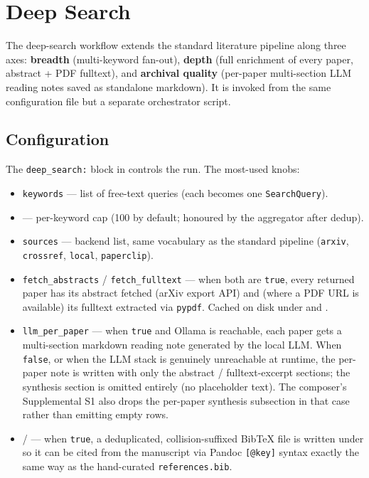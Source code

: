 \documentclass[
  english,
]{article}
\providecommand{\tightlist}{%
  \setlength{\itemsep}{0pt}\setlength{\parskip}{0pt}}
\begin{document}
\newpage

\section{Deep Search}\label{sec:deep_search}

The deep-search workflow extends the standard literature pipeline along
three axes: \textbf{breadth} (multi-keyword fan-out), \textbf{depth}
(full enrichment of every paper, abstract + PDF fulltext), and
\textbf{archival quality} (per-paper multi-section LLM reading notes
saved as standalone markdown). It is invoked from the same configuration
file but a separate orchestrator script.

\subsection{Configuration}\label{configuration}

The \texttt{deep\_search:} block in 
controls the run. The most-used knobs:

\begin{itemize}
\tightlist
\item
  \texttt{keywords} --- list of free-text queries (each becomes one
  \texttt{SearchQuery}).
\item
   --- per-keyword cap (100 by
  default; honoured by the aggregator after dedup).
\item
  \texttt{sources} --- backend list, same vocabulary as the standard
  pipeline (\texttt{arxiv}, \texttt{crossref}, \texttt{local},
  \texttt{paperclip}).
\item
  \texttt{fetch\_abstracts} / \texttt{fetch\_fulltext} --- when both are
  \texttt{true}, every returned paper has its abstract fetched (arXiv
  export API) and (where a PDF URL is available) its fulltext extracted
  via \texttt{pypdf}. Cached on disk under 
  and .
\item
  \texttt{llm\_per\_paper} --- when \texttt{true} and Ollama is
  reachable, each paper gets a multi-section markdown reading note
  generated by the local LLM. When \texttt{false}, or when the LLM stack
  is genuinely unreachable at runtime, the per-paper note is written
  with only the abstract / fulltext-excerpt sections; the synthesis
  section is omitted entirely (no placeholder text). The composer's
  Supplemental S1 also drops the per-paper synthesis subsection in that
  case rather than emitting empty rows.
\item
   /  ---
  when \texttt{true}, a deduplicated, collision-suffixed BibTeX file is
  written under  so it can be
  cited from the manuscript via Pandoc \texttt{{[}@key{]}} syntax
  exactly the same way as the hand-curated \texttt{references.bib}.
\end{itemize}
\end{document}
